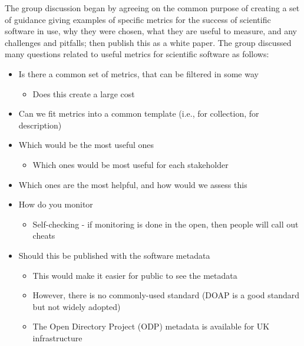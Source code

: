 The group discussion began by agreeing on the common purpose of creating a set
of guidance giving examples of specific metrics for the success of scientific
software in use, why they were chosen, what they are useful to measure, and any
challenges and pitfalls; then publish this as a white paper. The group discussed
many questions related to useful metrics for scientific software as follows:
\begin{itemize}

\item
Is there a common set of metrics, that can be filtered in some way

\begin{itemize}
\item
        Does this create a large cost
\end{itemize}

\item
Can we fit metrics into a common template (i.e., for collection, for description)

\item
Which would be the most useful ones

\begin{itemize}
\item
        Which ones would be most useful for each stakeholder
\end{itemize}

\item
Which ones are the most helpful, and how would we assess this

\item
How do you monitor

\begin{itemize}
\item
        Self-checking - if monitoring is done in the open, then people will call out cheats
\end{itemize}

\item
Should this be published with the software metadata

\begin{itemize}
\item
        This would make it easier for public to see the metadata

\item
However, there is no commonly-used standard (DOAP is a good standard but not
widely adopted)

\item
        The Open Directory Project (ODP) metadata is available for UK infrastructure
\end{itemize}


\end{itemize}
